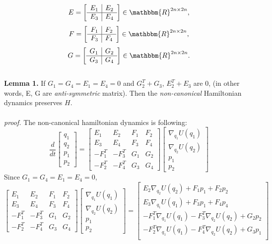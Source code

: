 \documentclass{article}
\begin{document}
\[
E=
\left[
\begin{array}{c|c}
E_1 & E_2 \\
\hline
E_3 & E_4
\end{array}
\right] \in \mathbbm{R}^{2n \times 2n},
\]
\[
F=
\left[
\begin{array}{c|c}
F_1 & F_2 \\
\hline
F_3 & F_4
\end{array}
\right] \in \mathbbm{R}^{2n \times 2n},
\]
\[
G=
\left[
\begin{array}{c|c}
G_1 & G_2 \\
\hline
G_3 & G_4
\end{array}
\right] \in \mathbbm{R}^{2n \times 2n}.
\]
\\

\noindent \textbf{Lemma 1.}  If $G_1 = G_4 = E_1 = E_4  = 0$ and $G_2^T + G_3$, $E_2^T + E_3$ are 0, (in other words, E, G are \textit{anti-symmetric} matrix). Then the \textit{non-canonical} Hamiltonian dynamics preserves $H$.
\\
\\
\textit{proof.} The non-canonical hamiltonian dynamics is following: 
\[
\frac{d}{dt}
\left[
\begin{array}{ccc}
q_1 \\
q_2 \\
p_1 \\
p_2 
\end{array}
\right]
=
\left[
\begin{array}{cclcc}
E_{1} & E_{2} & F_{1} & F_{2} \\
E_3 & E_4 & F_3 & F_4 \\
-F_1^T & -F_3^T & G_1 & G_2 \\
-F_2^T & -F_4^T & G_3 & G_4 
\end{array}
\right]
\left[
\begin{array}{ccc}
\nabla_{q_1} U(q_1) \\
\nabla_{q_2} U(q_2) \\
p_1 \\
p_2 
\end{array}
\right]
\] 
Since $G_1 = G_4 = E_1 = E_4  = 0$,
\[
\left[
\begin{array}{cclcc}
E_{1} & E_{2} & F_{1} & F_{2} \\
E_3 & E_4 & F_3 & F_4 \\
-F_1^T & -F_3^T & G_1 & G_2 \\
-F_2^T & -F_4^T & G_3 & G_4 
\end{array}
\right]
\left[
\begin{array}{ccc}
\nabla_{q_1} U(q_1) \\
\nabla_{q_2} U(q_2) \\
p_1 \\
p_2 
\end{array}
\right] = 
\left[
\begin{array}{ccc}
E_2 \nabla_{q_2} U(q_2) + F_1 p_1 + F_2 p_2 \\
E_3 \nabla_{q_1} U(q_1) + F_3 p_1 + F_4 p_4 \\
-F_1^T \nabla_{q_1} U(q_1) - F_3^T \nabla_{q_2} U(q_2)  + G_2 p_2\\
-F_2^T \nabla_{q_1} U(q_1) - F_4^T \nabla_{q_2} U(q_2)  + G_3 p_1\\
\end{array}
\right]
\] 
\end{document}
